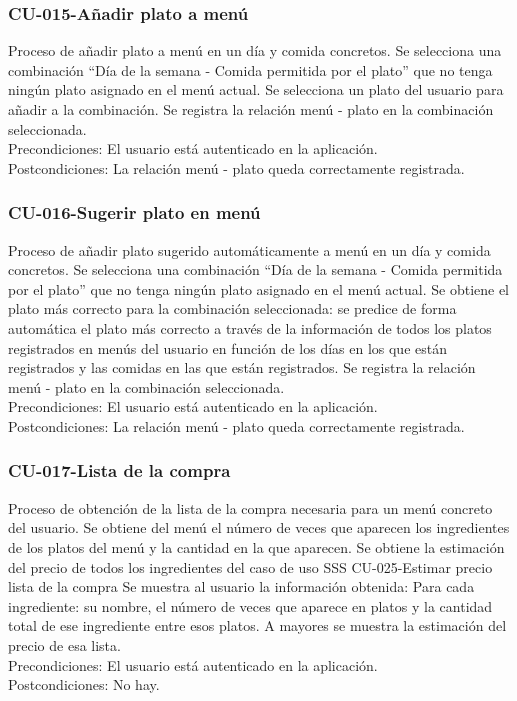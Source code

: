 \documentclass[12pt, a4paper, twoside]{book}
\begin{document}
	\subsubsection{CU-015-Añadir plato a menú}
	Proceso de añadir plato a menú en un día y comida concretos.
	Se selecciona una combinación ``Día de la semana - Comida permitida por el plato'' que no tenga ningún plato asignado en el menú actual.
	Se selecciona un plato del usuario para añadir a la combinación.
	Se registra la relación menú - plato en la combinación seleccionada.\\
	Precondiciones: El usuario está autenticado en la aplicación.\\
	Postcondiciones: La relación menú - plato queda correctamente registrada.
	\subsubsection{CU-016-Sugerir plato en menú}
	Proceso de añadir plato sugerido automáticamente a menú en un día y comida concretos.
	Se selecciona una combinación ``Día de la semana - Comida permitida por el plato'' que no tenga ningún plato asignado en el menú actual.
	Se obtiene el plato más correcto para la combinación seleccionada: se predice de forma automática el plato más correcto a través de la información de todos los platos registrados en menús del usuario en función de los días en los que están registrados y las comidas en las que están registrados.
	Se registra la relación menú - plato en la combinación seleccionada.\\
	Precondiciones: El usuario está autenticado en la aplicación.\\
	Postcondiciones: La relación menú - plato queda correctamente registrada.
	\subsubsection{CU-017-Lista de la compra}
	Proceso de obtención de la lista de la compra necesaria para un menú concreto del usuario.
	Se obtiene del menú el número de veces que aparecen los ingredientes de los platos del menú y la cantidad en la que aparecen.
	Se obtiene la estimación del precio de todos los ingredientes del caso de uso SSS CU-025-Estimar precio lista de la compra
	Se muestra al usuario la información obtenida: Para cada ingrediente: su nombre, el número de veces que aparece en platos y la cantidad total de ese ingrediente entre esos platos. A mayores se muestra la estimación del precio de esa lista.\\
	Precondiciones: El usuario está autenticado en la aplicación.\\
	Postcondiciones: No hay.
\end{document}
